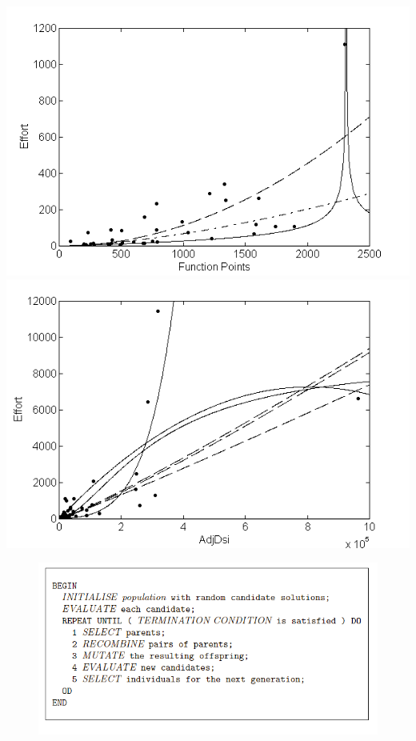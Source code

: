 \documentclass[]{book}
\begin{document}
\includegraphics{figures/gp1.png} \includegraphics{figures/gp2.png}

\begin{figure}[htbp]
\centering
\includegraphics{figures/evoAlg.png}
\caption{}
\end{figure}
\end{document}
